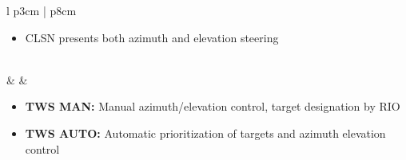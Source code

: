 \documentclass[8pt,usenames,dvipsnames,twoside]{article}
\begin{document}
\begin{center}
\begin{longtable}{l p{3cm} | p{8cm}}
\begin{minipage}[t]{\linewidth}
\begin{itemize}
\begin{itemize}
							\item CLSN presents both azimuth and elevation steering
						\end{itemize}
					\end{itemize}
				\end{minipage} \\
				\midrule
				\textbullet &  & 
				\begin{minipage}[t]{\linewidth}
					\vspace{-7pt}
					\begin{itemize}
						\item \textbf{TWS MAN:} Manual azimuth/elevation control, target designation by RIO
						\item \textbf{TWS AUTO:} Automatic prioritization of targets and azimuth elevation control
					\end{itemize}
				\end{minipage} \\
				\bottomrule
			\end{longtable}
		\end{center}
	
		\clearpage
	
\end{document}

